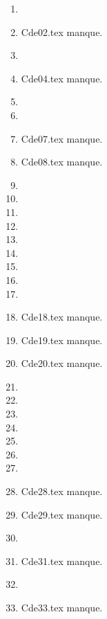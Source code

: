 \begin{enumerate}
  \item  
  \item Cde02.tex manque. 
  \item  
  \item Cde04.tex manque. 
  \item  
  \item  
  \item Cde07.tex manque. 
  \item Cde08.tex manque. 
  \item  
  \item  
  \item  
  \item  
  \item  
  \item  
  \item  
  \item  
  \item  
  \item Cde18.tex manque. 
  \item Cde19.tex manque. 
  \item Cde20.tex manque. 
  \item  
  \item  
  \item  
  \item  
  \item  
  \item  
  \item  
  \item Cde28.tex manque. 
  \item Cde29.tex manque. 
  \item  
  \item Cde31.tex manque. 
  \item  
  \item Cde33.tex manque. 
\end{enumerate} 
